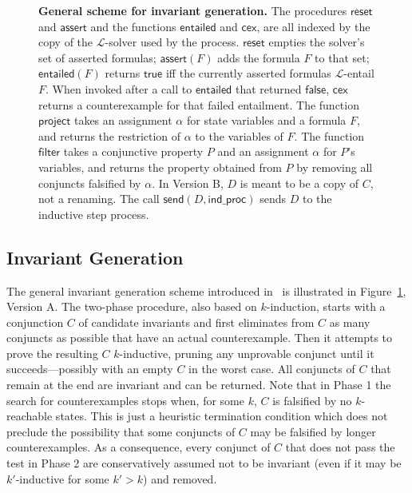 \documentclass[submission,copyright,creativecommons]{eptcs}
\newcommand{\lo}{\ensuremath{\mathcal{L}}\xspace}
\begin{document}
\begin{figure}[t]
\caption{
\textbf{General scheme for invariant generation.}
The procedures $\mathsf{reset}$ and $\mathsf{assert}$ and 
the functions $\mathsf{entailed}$ and $\mathsf{cex}$, 
are all indexed by the copy of the $\lo$-solver used by the process.
$\mathsf{reset}$ empties the solver's set of asserted formulas;
$\mathsf{assert}(F)$ adds the formula $F$ to that set;
$\mathsf{entailed}(F)$ returns $\mathsf{true}$
iff the currently asserted formulas $\lo$-entail $F$.
When invoked after a call to $\mathsf{entailed}$ that returned
$\mathsf{false}$, $\mathsf{cex}$ returns a counterexample 
for that failed entailment.
The function $\mathsf{project}$ 
takes an assignment $\alpha$ for state variables
and a formula $F$, and
returns the restriction of $\alpha$ to the variables of $F$.
The function $\mathsf{filter}$ takes a conjunctive property $P$
and an assignment $\alpha$ for $P$'s variables, and 
returns the property obtained from $P$
by removing all conjuncts falsified by $\alpha$.
In Version B, $D$ is meant to be a copy of $C$, not a renaming.
The call $\mathsf{send}(D, \mathsf{ind\_proc})$
sends $D$ to the inductive step process.
}
\label{fig:invariant_generation}
\end{figure}


\subsection{Invariant Generation}

The general invariant generation scheme introduced in~\cite{Kahsai-Ge-Tinelli-10}
is illustrated in Figure~\ref{fig:invariant_generation}, Version A.
The two-phase procedure, also based on $k$-induction,
starts with a conjunction $C$ of candidate invariants
and first eliminates from $C$ as many conjuncts as possible that have 
an actual counterexample.
Then it attempts to prove the resulting $C$ $k$-inductive,
pruning any unprovable conjunct until it succeeds---possibly with an empty $C$
in the worst case.
All conjuncts of $C$ that remain at the end are invariant and can be returned.
Note that in Phase 1 the search for counterexamples stops when,
for some $k$, $C$ is falsified by no $k$-reachable states.  This is
just a heuristic termination condition which does not preclude the
possibility that some conjuncts of $C$ may be falsified by longer
counterexamples.  As a consequence, every conjunct of $C$ that does
not pass the test in Phase 2 are conservatively assumed not to be
invariant (even if it may be $k'$-inductive for some $k' > k$) and
removed.
\end{document}
